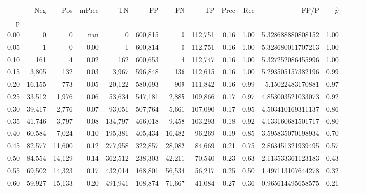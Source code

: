 \begin{tabular}{rrrrrrrrrrrrrrr}
\toprule
{} &     Neg &     Pos & mPrec &       TN &       FP &       FN &       TP &  Prec &   Rec &                    FP/P & $\hat{p}$ \\
p    &         &         &       &          &          &          &          &       &       &                         &           \\
\midrule
0.00 &       0 &       0 &   nan &        0 &  600,815 &        0 &  112,751 &  0.16 &  1.00 &       5.328688880808152 &      1.00 \\
0.05 &       1 &       0 &  0.00 &        1 &  600,814 &        0 &  112,751 &  0.16 &  1.00 &       5.328680011707213 &      1.00 \\
0.10 &     161 &       4 &  0.02 &      162 &  600,653 &        4 &  112,747 &  0.16 &  1.00 &       5.327252086455996 &      1.00 \\
0.15 &   3,805 &     132 &  0.03 &    3,967 &  596,848 &      136 &  112,615 &  0.16 &  1.00 &       5.293505157382196 &      0.99 \\
0.20 &  16,155 &     773 &  0.05 &   20,122 &  580,693 &      909 &  111,842 &  0.16 &  0.99 &        5.15022483170881 &      0.97 \\
0.25 &  33,512 &   1,976 &  0.06 &   53,634 &  547,181 &    2,885 &  109,866 &  0.17 &  0.97 &       4.853003521033073 &      0.92 \\
0.30 &  39,417 &   2,776 &  0.07 &   93,051 &  507,764 &    5,661 &  107,090 &  0.17 &  0.95 &       4.503410169311137 &      0.86 \\
0.35 &  41,746 &   3,797 &  0.08 &  134,797 &  466,018 &    9,458 &  103,293 &  0.18 &  0.92 &       4.133160681501717 &      0.80 \\
0.40 &  60,584 &   7,024 &  0.10 &  195,381 &  405,434 &   16,482 &   96,269 &  0.19 &  0.85 &       3.595835070198934 &      0.70 \\
0.45 &  82,577 &  11,600 &  0.12 &  277,958 &  322,857 &   28,082 &   84,669 &  0.21 &  0.75 &       2.863451321939495 &      0.57 \\
0.50 &  84,554 &  14,129 &  0.14 &  362,512 &  238,303 &   42,211 &   70,540 &  0.23 &  0.63 &       2.113533361123183 &      0.43 \\
0.55 &  69,502 &  14,323 &  0.17 &  432,014 &  168,801 &   56,534 &   56,217 &  0.25 &  0.50 &       1.497113107644278 &      0.32 \\
0.60 &  59,927 &  15,133 &  0.20 &  491,941 &  108,874 &   71,667 &   41,084 &  0.27 &  0.36 &       0.965614495658575 &      0.21 \\

\end{tabular}
